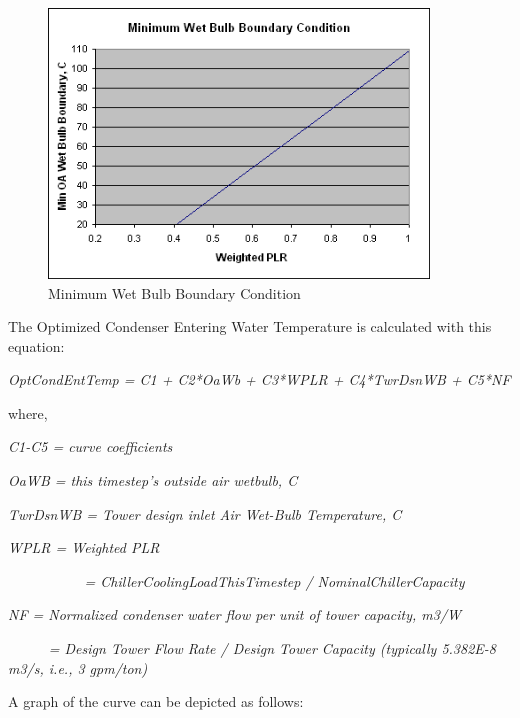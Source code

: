 \begin{figure}[hbtp] %
\centering
\includegraphics[width=0.9\textwidth, height=0.9\textheight, keepaspectratio=true]{media/image6483.png}
\caption{Minimum Wet Bulb Boundary Condition \protect \label{fig:minimum-wet-bulb-boundary-condition}}
\end{figure}

The Optimized Condenser Entering Water Temperature is calculated with this equation:

\emph{OptCondEntTemp = C1 + C2*OaWb + C3*WPLR + C4*TwrDsnWB + C5*NF}

where,

\emph{C1-C5 = curve coefficients}

\emph{OaWB = this timestep's outside air wetbulb, C}

\emph{TwrDsnWB = Tower design inlet Air Wet-Bulb Temperature, C}

\emph{WPLR = Weighted PLR}

\emph{~~~~~~~~~~ = ChillerCoolingLoadThisTimestep / NominalChillerCapacity}

\emph{NF = Normalized condenser water flow per unit of tower capacity, m3/W}

\emph{~~~~~ = Design Tower Flow Rate / Design Tower Capacity (typically 5.382E-8 m3/s, i.e., 3 gpm/ton)}

A graph of the curve can be depicted as follows:

